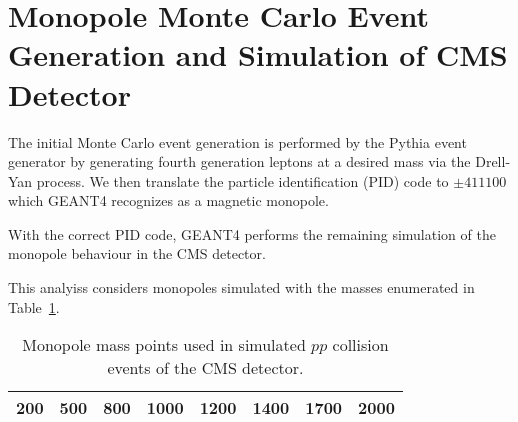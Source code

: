 

\section{Monopole Monte Carlo Event Generation and Simulation of CMS Detector}
The initial Monte Carlo event generation is performed by the Pythia event generator by generating fourth 
generation leptons at a desired mass via the Drell-Yan process.  We then translate the particle identification (PID)
code to $\pm411100$ which GEANT4 recognizes as a magnetic monopole.

With the correct PID code, GEANT4 performs the remaining simulation of the monopole behaviour in the CMS
detector.

This analyiss considers monopoles simulated with the masses enumerated in Table~\ref{tab:masses}.
\begin{table}[H]
\centering
\caption{Monopole mass points used in simulated $pp$ collision events of the CMS detector.}
\label{tab:masses}
\begin{tabular}{|c|c|c|c|c|c|c|c|}
\hline
200 & 500 & 800 & 1000 & 1200 & 1400 & 1700 & 2000 \\ \hline
\end{tabular}
\end{table}

